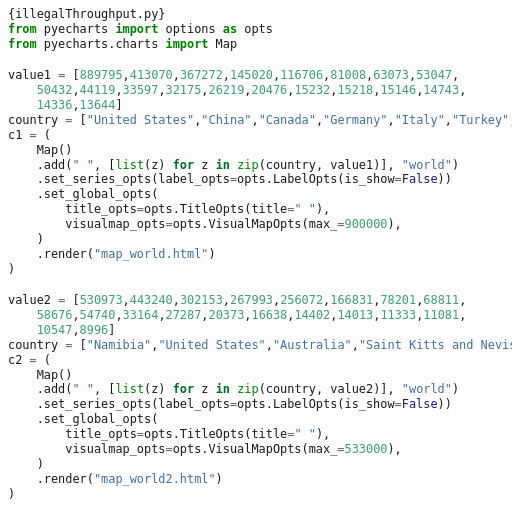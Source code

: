 \documentclass[12pt]{article}
\begin{document}
\begin{lstlisting}[language=Python]{illegalThroughput.py}
from pyecharts import options as opts
from pyecharts.charts import Map

value1 = [889795,413070,367272,145020,116706,81008,63073,53047,
	50432,44119,33597,32175,26219,20476,15232,15218,15146,14743,
	14336,13644]
country = ["United States","China","Canada","Germany","Italy","Turkey","Thailand","colombia","Viet Nam","Greece","South Africa","Singapore","France","United Kingdom","Portugal","Switzerland","Russian Federation","Norway","Mexico","Spain"]
c1 = (
    Map()
    .add(" ", [list(z) for z in zip(country, value1)], "world")
    .set_series_opts(label_opts=opts.LabelOpts(is_show=False))
    .set_global_opts(
        title_opts=opts.TitleOpts(title=" "),
        visualmap_opts=opts.VisualMapOpts(max_=900000),
    )
    .render("map_world.html")
)

value2 = [530973,443240,302153,267993,256072,166831,78201,68811,
	58676,54740,33164,27287,20373,16638,14402,14013,11333,11081,
	10547,8996]
country = ["Namibia","United States","Australia","Saint Kitts and Nevis","Canada","Peru","South Africa","Argentina","Zimbabwe","Russian Federation","Bangladesh","Indonesia","Gabon","United Republic of Tanzania","Democratic Republic of the Congo","Costa Rica","Madagascar","Senegal","Liberia","Mauritius"]
c2 = (
    Map()
    .add(" ", [list(z) for z in zip(country, value2)], "world")
    .set_series_opts(label_opts=opts.LabelOpts(is_show=False))
    .set_global_opts(
        title_opts=opts.TitleOpts(title=" "),
        visualmap_opts=opts.VisualMapOpts(max_=533000),
    )
    .render("map_world2.html")
)

\end{lstlisting}
\end{document}
